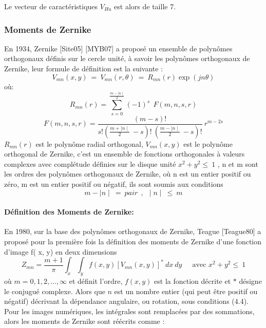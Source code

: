 Le vecteur de caractéristiques $ V_{Hu} $ est alors de taille 7.
\subsubsection{Moments de Zernike}
En 1934, Zernike [Site05] [MYB07] a proposé un ensemble de polynômes orthogonaux définis sur le cercle unité, à savoir les polynômes orthogonaux de Zernike, leur formule de définition est la suivante :
\begin{equation}
V_{mn}(x, y)~=~V_{mn}(r,\theta)~=~R_{mn}(r)\exp(jn\theta)
\end{equation}
où:
\begin{displaymath}
R_{mn}(r) = \sum_{s=0}^{\frac{m-\mid n \mid}{2}}(-1)^{s}~~F(m,n,s,r)
\end{displaymath}
\begin{displaymath}
F(m,n,s,r) = \frac{(m-s)!}{s!(\frac{m+\mid n \mid}{2}~-s)!~(\frac{m-\mid n \mid}{2}~-s)! }~r^{m-2s}
\end{displaymath}
$ R_{mn}(r) $  est le polynôme radial orthogonal, $ V_{mn}(x, y) $ est le polynôme orthogonal de Zernike, c'est un ensemble de fonctions orthogonales à valeurs complexes avec complétude définies sur le disque unité $x^{2} + y^{2} \leq ~1$ , n et m sont les ordres des polynômes orthogonaux de Zernike, où n est un entier positif ou zéro, m est un entier positif ou négatif, ils sont soumis aux conditions 
\begin{equation}
m- \mid n \mid ~=~pair~~,~~\mid n \mid~\leq~m
\end{equation}

\paragraph{Définition des Moments de Zernike:}
En 1980, sur la base des polynômes orthogonaux de Zernike, Teague [Teague80] a proposé pour la première fois la définition des moments de Zernike d'une fonction d'image f( x, y) en deux dimensions
\begin{equation}
Z_{mn} = \frac{m+1}{\pi} \int_{x} \int_{y} f(x,y)[V_{mn}(x,y)]^{*} ~dx~dy~~~~~\mbox{ avec $x^{2} + y^{2} \leq ~1$}
\end{equation}
où $m = 0,1,2,...,\infty$ et définit l'ordre, $f(x,y)$ est la fonction décrite et $*$ désigne le conjugué complexe. Alors que $n$ est un nombre entier (qui peut être positif ou négatif) décrivant la dépendance angulaire, ou rotation, sous conditions (4.4). Pour les images numériques, les intégrales sont remplacées par des sommations, alors les moments de Zernike sont réécrits comme :

